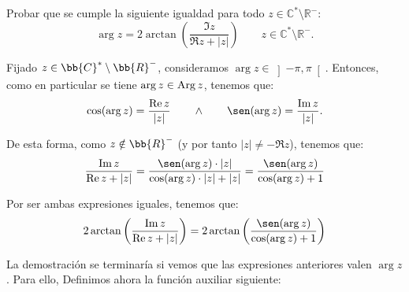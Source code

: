 \begin{ejercicio}\label{ej:1.6}
    Probar que se cumple la siguiente igualdad para todo $z \in \mathbb{C}^\ast \setminus \mathbb{R}^-$:
    \[
        \arg z = 2\arctan\left(\dfrac{\Im z}{\Re z + |z|}\right)\qquad z\in \mathbb{C}^\ast \setminus \mathbb{R}^-.
    \]

    Fijado $z\in \bb{C}^*\setminus \bb{R}^-$, consideramos $\arg z\in \left]-\pi,\pi\right[$. Entonces, como en particular se tiene $\arg z\in\operatorname{Arg} z$, tenemos que:
    \begin{equation*}
        \cos (\arg z) = \dfrac{\Re z}{|z|} \qquad \land \qquad \sen(\arg z) = \dfrac{\Im z}{|z|}.
    \end{equation*}
    \begin{comment}
    \begin{equation*}
        \left\{
            \begin{array}{c}
                \cos\theta = \dfrac{\Re z}{|z|} \\ \land \\ \sen\theta = \dfrac{\Im z}{|z|}.
            \end{array}
        \right\}
        \Longleftrightarrow \theta\in \Arg z
    \end{equation*}
    \end{comment}

    De esta forma, como $z\notin \bb{R}^-$ (y por tanto $|z|\neq -\Re z$), tenemos que:
    \begin{align*}
        \dfrac{\Im z}{\Re z + |z|}
        = \dfrac{\sen(\arg z)\cdot |z|}{\cos(\arg z)\cdot |z| + |z|}
        = \dfrac{\sen(\arg z)}{\cos(\arg z) + 1}
    \end{align*}

    Por ser ambas expresiones iguales, tenemos que:
    \begin{equation*}
        2\arctan\left(\dfrac{\Im z}{\Re z + |z|}\right)=2\arctan\left(\dfrac{\sen(\arg z)}{\cos(\arg z) + 1}\right)
    \end{equation*}

    La demostración se terminaría si vemos que las expresiones anteriores valen $\arg z$. Para ello, Definimos ahora la función auxiliar siguiente:
    \Func{f}{\left]-\pi,\pi\right[}{\bb{R}}{\alpha}{\alpha - 2\arctan\left(\dfrac{\sen\alpha}{\cos\alpha + 1}\right)}


\end{ejercicio}
